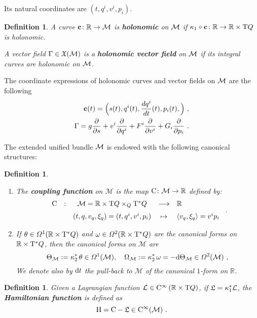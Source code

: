 \documentclass[12pt]{report}
\newtheorem{definition}[teor]{Definition}
\def\beann{\begin{eqnarray*}}
\def\eeann{\end{eqnarray*}}
\def\ben{\begin{enumerate}}
\def\een{\end{enumerate}}
\def\derpar#1#2{\frac{\partial{#1}}{\partial{#2}}}
\def\vf{\mathfrak X}
\def\df{{\mit\Omega}}
\def\Lag{{\cal L}}
\def\d{{\rm d}}
\def\Real{\mathbb{R}}
\def\Tan{{\rm T}}
\def\Cinfty{{\rm C}^\infty}
\begin{document}
Its natural coordinates are $(t,q^i,v^i,p_i)$. 

\begin{definition}
A curve ${\bf c}\colon\Real\rightarrow{\cal M}$
is \textbf{holonomic} on ${\cal M}$ if
$\kappa_1\circ{\bf c}\colon\Real\to\Real\times\Tan Q$ is holonomic.

A vector field $\Gamma \in\vf({\cal M})$  is a \textbf{holonomic vector field} on ${\cal M}$
if its integral curves  are holonomic on ${\cal M}$. 
\end{definition}

The coordinate expressions of holonomic curves and vector fields on  ${\cal M}$ are the following
\beann
{\bf c}(t)=\Big(s(t),q^i(t),\frac{dq^i}{d t}(t),p_i(t),\Big) \ , \\
\Gamma= g\derpar{}{s}+v^i\derpar{}{q^i}+F^i\derpar{}{v^i}+G_i\derpar{}{p_i}  \ .
\eeann

The extended unified bundle ${\cal M}$ is endowed with the following canonical structures:

\begin{definition}
\ben
\item
The \textbf{coupling function} on ${\mathcal M}$
is the map ${\rm C}\colon{\mathcal M}\to\Real$  defined by:
$$
\begin{array}{ccccl}
{\rm C} & : & {\mathcal M}=\Real
\times\Tan Q \times_Q\Tan^*Q& \longrightarrow & \Real \\
\noalign{\medskip} & & (t, q,v_q,\xi_q)=(t,q^i,v^i,p_i)
 & \mapsto &  \langle v_q,\xi_q\rangle=v^ip_i
\end{array} \ .
$$
\item
If $\theta\in\df^1(\Real\times\Tan^*Q)$ and $\omega\in\df^2(\Real\times\Tan^*Q)$
are the canonical forms on $\Real\times\Tan^*Q$,
then the canonical forms on ${\mathcal M}$ are
$$
\Theta_{\mathcal M}:=\kappa_2^*\,\theta\in\df^1({\mathcal M})
,\quad
\Omega_{\mathcal M}:=\kappa_2^*\,\omega=-\d\Theta_{\mathcal M}\in\df^2({\mathcal M}) \ ,
$$
We denote also by $\d t$ the pull-back to ${\mathcal M}$ of the canonical $1$-form on $\Real$.
\een
\end{definition}

\begin{definition}
Given a Lagrangian function $\Lag\in\Cinfty \left(\Real \times \Tan Q \right)$,
if ${\mathfrak L}=\kappa_1^*\Lag$, the \textbf{Hamiltonian function} is defined as
$$
{\rm H}={\rm C}-{\mathfrak L}\in\Cinfty({\mathcal M}) \ .
$$
\end{definition}
\end{document}
